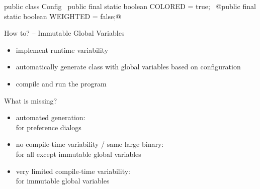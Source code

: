 \begin{frame}[fragile]{\myframetitle}
	\begin{mycolumns}[widths={48}]
\begin{codetight}[basicstyle=\small]{}
public class Config {
	~public final static boolean COLORED = true;~
	@public final static boolean WEIGHTED = false;@
}
\end{codetight}
		\begin{definition}{How to? -- Immutable Global Variables}
			\begin{itemize}
				\item implement runtime variability
				\item automatically generate class with global variables based on configuration
				\item compile and run the program
			\end{itemize}
		\end{definition}
	\mynextcolumn
		\begin{note}{What is missing?}
			\begin{itemize}
				\item automated generation:\\\hfill for preference dialogs
				\item no compile-time variability / same large binary:\\\hfill for all except immutable global variables
				\item very limited compile-time variability:\\\hfill for immutable global variables
			\end{itemize}
		\end{note}
	\end{mycolumns}
\end{frame}

